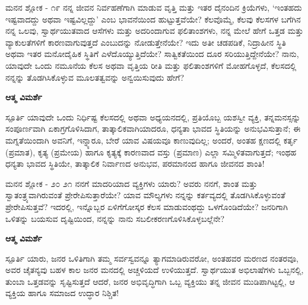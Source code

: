 \begin{mananam}{\mananamfont ಮನನ ಶ್ಲೋಕ - ೧೯}
\mananamtext ನನ್ನ ಜೀವನ ನಿರ್ವಹಣೆಗಾಗಿ ಮಾಡುವ ವೃತ್ತಿ ಮತ್ತು ಇತರ ದೈನಂದಿನ ಕ್ರಿಯೆಗಳು, ‘ಇಂತಹದು ಇಷ್ಟವಾದದ್ದು ಅಥವಾ ಇಷ್ಟವಿಲ್ಲದ್ದು’ ಎಂಬ ಭಾವನೆಯಿಂದ ಹುಟ್ಟುತ್ತವೆಯೇ? ಕೆಲವೊಮ್ಮೆ, ಕೆಲವು ಕೆಲಸಗಳ ಬಗೆಗಿನ ನನ್ನ ಒಲವು, ಸ್ವಾರ್ಥಯುತವಾದ ಆಸೆಗಳು ಮತ್ತು ಅದರಿಂದಾಗುವ ಫಲಿತಾಂಶಗಳು, ನನ್ನ ಮೇಲೆ  ಹೇಗೆ ಒತ್ತಡ ಮತ್ತು ವ್ಯಾಕುಲತೆಗಳಿಗೆ ಕಾರಣವಾಗುವುತ್ತದೆ ಎಂಬುದನ್ನು ನೋಡುತ್ತೇನೆಯೇ? ಇದು ಅತೀ ಚಡಪಡಿಕೆ, ನಿದ್ರಾಹೀನ ಸ್ಥಿತಿ ಅಥವಾ ಇತರ ಮನೋದೈಹಿಕ ಸ್ಥಿತಿಗೆ ಎಳೆದೊಯ್ಯುತ್ತಿದೆಯೇ? ಸಾತ್ವಿಕತೆಯಿಂದ ದೂರ ಸರಿಯುತ್ತಿದ್ದೇನೆಯೇ? ನಾನು, ಯಾವುದೇ ಒಂದು ನಮೂನೆಯ ಕೆಲಸ ಅಥವಾ ವೃತ್ತಿಯ ರೀತಿ ಮತ್ತು ಫಲಿತಾಂಶಗಳಿಗೆ ಮೋಹಗೊಳ್ಳದೆ, ಕೆಲಸದಲ್ಲಿ ನನ್ನನ್ನು ತೊಡಗಿಸಿಕೊಳ್ಳುವ ಮೂಲತತ್ವವನ್ನು ಅನ್ವಯಿಸುವುದು ಹೇಗೆ? 
\end{mananam}
\WritingHand\enspace\textbf{ಆತ್ಮ ವಿಮರ್ಶೆ}\\
\begin{inspiration}{\mananamfont ಸ್ಪೂರ್ತಿ}
\mananamtext ಯಾವುದೇ ಒಂದು ನಿರ್ಧಿಷ್ಟ ಕೆಲಸದಲ್ಲಿ ಅಥವಾ ಅಧ್ಯಯನದಲ್ಲಿ, ಪ್ರತಿಯೊಬ್ಬ ಯಶಸ್ವೀ ವ್ಯಕ್ತಿ, ತನ್ನಮನಸ್ಸನ್ನು ಸಂಪೂರ್ಣವಾಗಿ ಏಕಾಗ್ರಗೊಳಿಸಿದಾಗ, ತಾತ್ಕಾಲಿಕವಾಗಿಯಾದರೂ, ಧನ್ಯತಾ ಭಾವದ ಸ್ಥಿತಿಯನ್ನು ಅನುಭವಿಸುತ್ತಾನೆ; ಈ ಮಗ್ನತೆಯಿಂದಾಗಿ ಅವನಿಗೆ, ಇನ್ನ್ಯಾರೂ, ಬೇರೆ ಯಾವ ವಿಷಯವೂ ಕಾಣುವುದಿಲ್ಲ; ಅಂದರೆ, ಅಂತಹ ಕ್ಷಣದಲ್ಲಿ ಕರ್ತೃ (ಪ್ರಮಾತ), ಕೃತ್ಯ (ಪ್ರಮೇಯ) ಹಾಗೂ ಕೃತ್ಯಕ್ಕೆ ಕಾರಣವಾದ ವಸ್ತು (ಪ್ರಮಾಣ) ಎಲ್ಲಾ ಸಮ್ಮಿಳಿತವಾಗುತ್ತದೆ; ಇಂಥಹ ಧನ್ಯತಾ ಭಾವದ ಸ್ಥಿತಿಯೇ, ತಾತ್ಕಾಲಿಕ ನಿರ್ವಾಣದ ಅನುಭವ, ಪರಮಾನಂದ ಹಾಗೂ ಜೀವನದ ಶಾಂತಿ! 
\end{inspiration}
\newpage

\begin{mananam}{\mananamfont ಮನನ ಶ್ಲೋಕ - ೨೦ ೨೧}
\mananamtext ನನಗೆ ಮಾದರಿಯಾದ ವ್ಯಕ್ತಿಗಳು ಯಾರು? ಅವರು ನನಗೆ, ಶಾಂತ ಮತ್ತು ಸ್ವಾತಂತ್ರ್ಯವಾಗಿರುವಂತೆ ಪ್ರೇರೇಪಿಸುತ್ತಾರೆಯೇ? ಯಾವ ಮೌಲ್ಯಗಳು ನನ್ನನ್ನು ಕರ್ತವ್ಯದಲ್ಲಿ ತೊಡಗಿಸಿಕೊಳ್ಳುವಂತೆ ಪ್ರೇರೇಪಿಸುತ್ತವೆ? ಇದರಲ್ಲಿ,  ಇನ್ನೊಬ್ಬರ ಏಳಿಗೆಗೋಸ್ಕರ ಕೆಲಸ ಮಾಡುವಂಥದ್ದು ಒಳಗೊಂಡಿದೆಯೇ? ಜನರಿಗಾಗಿ ಒಳಿತನ್ನು ಬಯಸುವ ದೃಷ್ಟಿಯಿಂದ, ನನ್ನನ್ನು ನಾನು ಸಬಲೀಕರಣಗೊಳಿಸಿಕೊಳ್ಳಬಲ್ಲೆನೇ? 
\end{mananam}
\WritingHand\enspace\textbf{ಆತ್ಮ ವಿಮರ್ಶೆ}\\
\begin{inspiration}{\mananamfont ಸ್ಪೂರ್ತಿ}
\mananamtext ಯಾರು, ಜನರ ಒಳಿತಿಗಾಗಿ ತಮ್ಮ ಸರ್ವಸ್ವವನ್ನೂ ತ್ಯಾಗಮಾಡಿರುವರೋ, ಅಂತಹವರ ಮರಣದ ನಂತರವೂ, ಅವರ ಚೈತನ್ಯವು ಬಹಳ ಕಾಲ ಜನರ ಮನದಲ್ಲಿ ಅಚ್ಚಳಿಯದೆ ಉಳಿಯುತ್ತದೆ. ಸ್ವಾರ್ಥಯುತ ಅಭಿಲಾಷೆಗಳು ಒಬ್ಬನಲ್ಲಿ, ತುಂಬಾ ಒತ್ತಡವನ್ನು ಸೃಷ್ಟಿಸುತ್ತದೆ ಆದರೆ, ಜನರ ಅಭಿವೃದ್ಧಿಗಾಗಿ ಒಬ್ಬ ವ್ಯಕ್ತಿಯು ತನ್ನ ಜೀವನ ಮುಡಿಪಾಗಿಟ್ಟಲ್ಲಿ, ಆ ವ್ಯಕ್ತಿಯ ಹಾಗೂ ಸಮಾಜದ ಉದ್ಧಾರ ನಿಶ್ಚಿತ!
\end{inspiration}
\newpage

